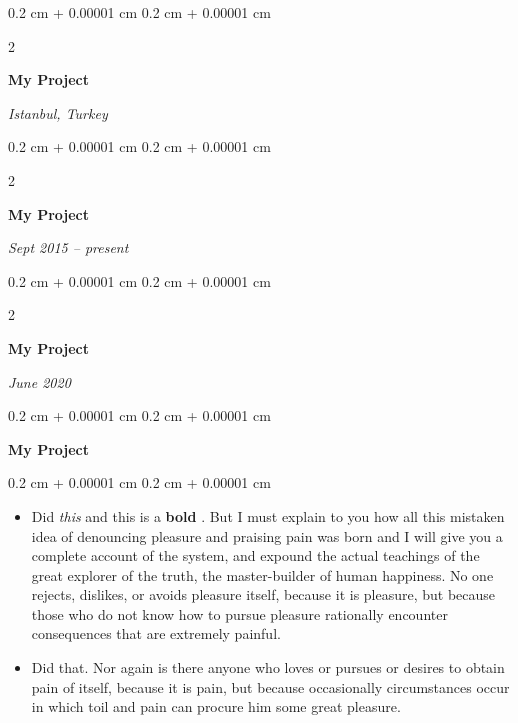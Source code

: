 \documentclass[10pt, letterpaper]{article}
\newenvironment{highlights}{
    \begin{itemize}[
        topsep=0.10 cm,
        parsep=0.10 cm,
        partopsep=0pt,
        itemsep=0pt,
        leftmargin=0.4 cm + 10pt
    ]
}{
    \end{itemize}
} %
\newenvironment{onecolentry}{
    \begin{adjustwidth}{
        0.2 cm + 0.00001 cm
    }{
        0.2 cm + 0.00001 cm
    }
}{
    \end{adjustwidth}
} %
\newenvironment{twocolentry}[2][]{
    \onecolentry
    \def\secondColumn{#2}
    \setcolumnwidth{\fill, 4.5 cm}
    \begin{paracol}{2}
}{
    \switchcolumn \raggedleft \secondColumn
    \end{paracol}
    \endonecolentry
} %
\let\hrefWithoutArrow\href
\renewcommand{\href}[2]{\hrefWithoutArrow{#1}{\ifthenelse{\equal{#2}{}}{ }{#2 }\raisebox{.15ex}{\footnotesize \faExternalLink*}}}
\begin{document}
        \vspace{0.2 cm}

        \begin{twocolentry}{
        \textit{Istanbul, Turkey}    
            
        }
            \textbf{My Project}
        \end{twocolentry}



        \vspace{0.2 cm}

        \begin{twocolentry}{
            
            
        \textit{Sept 2015 – present}}
            \textbf{My Project}
        \end{twocolentry}



        \vspace{0.2 cm}

        \begin{twocolentry}{
            
            
        \textit{June 2020}}
            \textbf{My Project}
        \end{twocolentry}



        \vspace{0.2 cm}

        \begin{onecolentry}
            \textbf{My Project}
        \end{onecolentry}

        \vspace{0.10 cm}
        \begin{onecolentry}
            \begin{highlights}
                \item Did \textit{this} and this is a \textbf{bold} \href{https://example.com}{link}. But I must explain to you how all this mistaken idea of denouncing pleasure and praising pain was born and I will give you a complete account of the system, and expound the actual teachings of the great explorer of the truth, the master-builder of human happiness. No one rejects, dislikes, or avoids pleasure itself, because it is pleasure, but because those who do not know how to pursue pleasure rationally encounter consequences that are extremely painful.
                \item Did that. Nor again is there anyone who loves or pursues or desires to obtain pain of itself, because it is pain, but because occasionally circumstances occur in which toil and pain can procure him some great pleasure.
            \end{highlights}
        \end{onecolentry}
\end{document}
